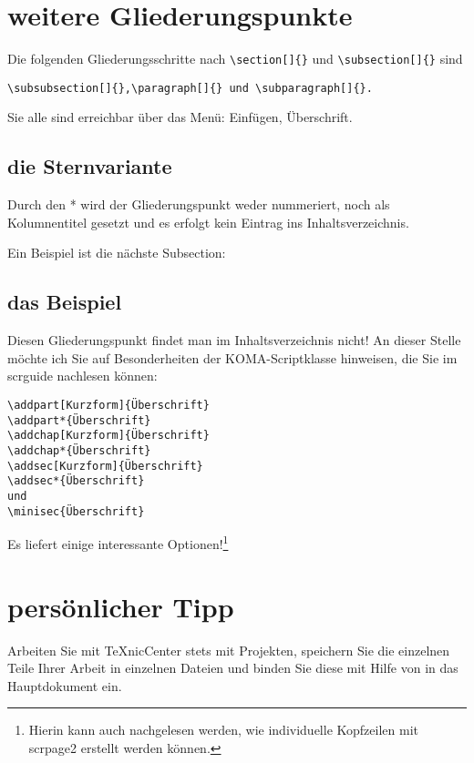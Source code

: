\documentclass[a4paper,%
twoside,							%
headsepline = true,				%
footsepline = true,				%
headings=normal,
<<<<<<< HEAD
listof=totoc,					%
bibliography=totoc,			%
listof=entryprefix,
=======
listof = totoc,					%
bibliography = totoc,		%
listof = entryprefix,		%
>>>>>>> ff10663913a94aea2786594bebcc3acc7eb1273d
<<<<<<< HEAD
, draft
=======
>>>>>>> ff10663913a94aea2786594bebcc3acc7eb1273d
]
{scrartcl}
\begin{document}
\section{weitere Gliederungspunkte}
Die folgenden Gliederungsschritte nach \verb#\section[]{}# und \verb#\subsection[]{}# sind 
\begin{verbatim}
\subsubsection[]{},\paragraph[]{} und \subparagraph[]{}.
\end{verbatim}

Sie alle sind erreichbar über das Menü: Einfügen, Überschrift.

\subsection{die Sternvariante}
Durch den * wird der Gliederungspunkt weder nummeriert, noch als Kolumnentitel gesetzt und es erfolgt kein Eintrag
ins Inhaltsverzeichnis.

Ein Beispiel ist die nächste Subsection:

\subsection*{das Beispiel}
Diesen Gliederungspunkt findet man im Inhaltsverzeichnis nicht!
An dieser Stelle möchte ich Sie auf Besonderheiten der KOMA-Scriptklasse hinweisen, die Sie im scrguide nachlesen können:
\begin{verbatim}
\addpart[Kurzform]{Überschrift}
\addpart*{Überschrift}
\addchap[Kurzform]{Überschrift}
\addchap*{Überschrift}
\addsec[Kurzform]{Überschrift}
\addsec*{Überschrift}
und
\minisec{Überschrift}
\end{verbatim}
Es liefert einige interessante Optionen!\footnote{Hierin kann auch nachgelesen werden, wie individuelle Kopfzeilen mit scrpage2 erstellt werden können.}

\section{persönlicher Tipp}
Arbeiten Sie mit TeXnicCenter stets mit Projekten, speichern Sie die einzelnen Teile Ihrer Arbeit in einzelnen Dateien und binden Sie diese mit Hilfe von \verb## in das Hauptdokument ein.
\end{document}

